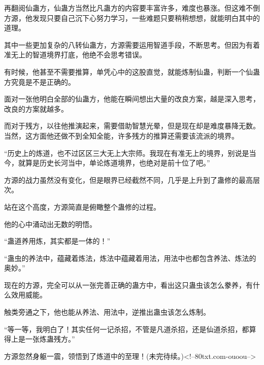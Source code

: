 \begin{this_body}
再翻阅仙蛊方，仙蛊方当然比凡蛊方的内容要丰富许多，难度也暴涨。但这难不倒方源，他发现只要自己沉下心努力学习，一些难题只要稍稍想想，就能明白其中的道理。

其中一些更加复杂的八转仙蛊方，方源需要运用智道手段，不断思考。但因为有着准无上的智道境界打底，他绝不会思考错误。

有时候，他甚至不需要推算，单凭心中的这股直觉，就能炼制仙蛊，判断一个仙蛊方究竟是不是正确的。

面对一张他明白全部的仙蛊方，他能在瞬间想出大量的改良方案，越是深入思考，改良的方案就越多。

而对于残方，以往他推演起来，需要借助智慧光晕，但是现在却是难度暴降无数。当然，这方面他还做不到全知全能，许多残方的推算还需要该流派的境界。

“历史上的炼道，也不过区区三大无上大宗师。我现在有准无上的境界，别说是当今，就算是历史长河当中，单论炼道境界，也绝对是前十位了吧。”

方源的战力虽然没有变化，但是眼界已经截然不同，几乎是上升到了蛊修的最高层次。

站在这个高度，方源简直是俯瞰整个蛊修的过程。

他的心中涌动出无数的明悟。

“蛊道养用炼，其实都是一体的！”

“蛊虫的养法中，蕴藏着炼法，炼法中蕴藏着用法，用法中也都包含养法、炼法的奥妙。”

现在的方源，完全可以从一张完善正确的蛊方中，看出这只蛊虫该怎么豢养，有什么效用威能。

触类旁通之下，他也能从养法、用法中，逆推出蛊虫该怎么炼制。

“等一等，我明白了！其实任何一记杀招，不管是凡道杀招，还是仙道杀招，都算得上是一张炼蛊残方。”

方源忽然身躯一震，领悟到了炼道中的至理！(未完待续。)<!--80txt.com-ouoou-->

\end{this_body}

